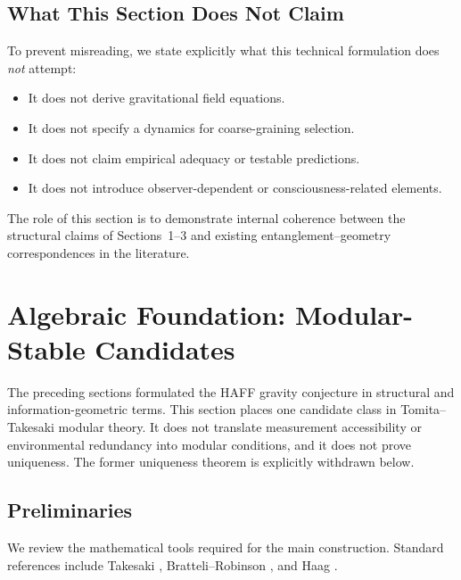 \documentclass[12pt,a4paper,openany]{book}
\begin{document}
\subsection{What This Section Does Not Claim}

To prevent misreading, we state explicitly what this technical formulation does \emph{not} attempt:

\begin{itemize}
    \item It does not derive gravitational field equations.
    \item It does not specify a dynamics for coarse-graining selection.
    \item It does not claim empirical adequacy or testable predictions.
    \item It does not introduce observer-dependent or consciousness-related elements.
\end{itemize}

The role of this section is to demonstrate internal coherence between the structural claims of Sections~1--3 and existing entanglement--geometry correspondences in the literature.


\section{Algebraic Foundation: Modular-Stable Candidates}
\label{H-D-sec:modular}

The preceding sections formulated the HAFF gravity conjecture in structural and information-geometric terms.  This section places one candidate class in Tomita--Takesaki modular theory.  It does not translate measurement accessibility or environmental redundancy into modular conditions, and it does not prove uniqueness.  The former uniqueness theorem is explicitly withdrawn below.


\subsection{Preliminaries}
\label{H-D-sec:modular-prelim}

We review the mathematical tools required for the main construction. Standard references include Takesaki \cite{Takesaki2003}, Bratteli--Robinson \cite{BratteliRobinson1997}, and Haag \cite{Haag1996}.
\end{document}
